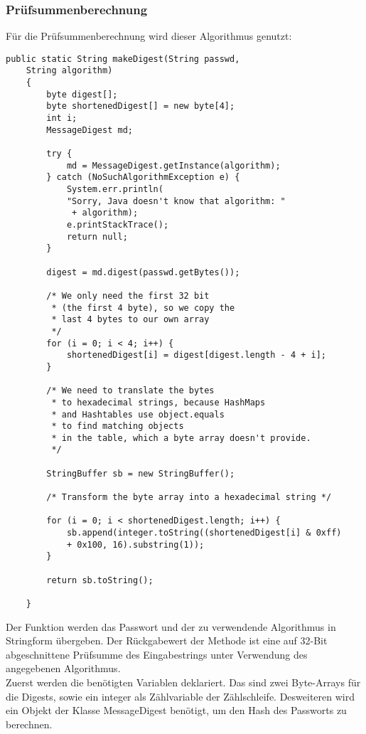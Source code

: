 \documentclass[11pt]{article}
\begin{document}
\subsubsection{Prüfsummenberechnung}
Für die Prüfsummenberechnung wird dieser Algorithmus genutzt: 
\begin{lstlisting}[caption=Algorithmus zur Prüfsummenberechnung, label=lst:makeDigest, basicstyle=\tiny]
    public static String makeDigest(String passwd, 
    String algorithm) 
    {
        byte digest[];
        byte shortenedDigest[] = new byte[4];
        int i;
        MessageDigest md;
        
        try {
            md = MessageDigest.getInstance(algorithm);
        } catch (NoSuchAlgorithmException e) {
            System.err.println(
            "Sorry, Java doesn't know that algorithm: "
             + algorithm);
            e.printStackTrace();
            return null;
        }
        
        digest = md.digest(passwd.getBytes());
        
        /* We only need the first 32 bit 
         * (the first 4 byte), so we copy the
         * last 4 bytes to our own array
         */
        for (i = 0; i < 4; i++) {
            shortenedDigest[i] = digest[digest.length - 4 + i];
        }
        
        /* We need to translate the bytes 
         * to hexadecimal strings, because HashMaps
         * and Hashtables use object.equals 
         * to find matching objects
         * in the table, which a byte array doesn't provide.
         */
         
        StringBuffer sb = new StringBuffer();
        
        /* Transform the byte array into a hexadecimal string */
        
        for (i = 0; i < shortenedDigest.length; i++) {
            sb.append(integer.toString((shortenedDigest[i] & 0xff) 
            + 0x100, 16).substring(1));
        }
        
        return sb.toString();

    }
\end{lstlisting}
Der Funktion werden das Passwort und der zu verwendende Algorithmus in Stringform übergeben.
Der Rückgabewert der Methode ist eine auf 32-Bit abgeschnittene Prüfsumme des Eingabestrings unter Verwendung des angegebenen Algorithmus.\\
Zuerst werden die benötigten Variablen deklariert. Das sind zwei Byte-Arrays für die Digests, sowie ein integer als Zählvariable der Zählschleife. Desweiteren wird ein Objekt der Klasse MessageDigest benötigt, um den Hash des Passworts zu berechnen. \\
\end{document}
